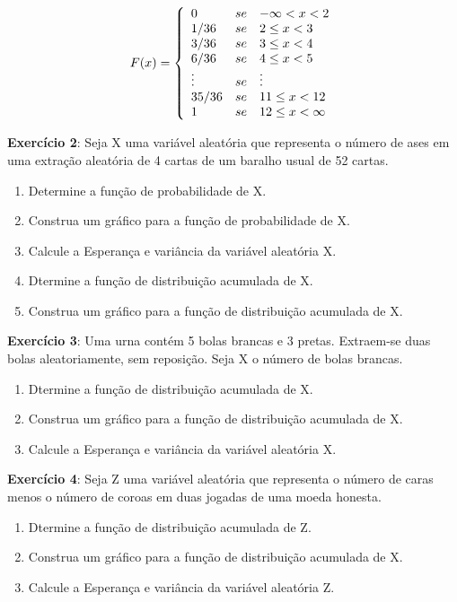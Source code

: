 $$
F(x)=
\left\{%
\begin{array}{ll}
   0      & se \quad \hbox{$-\infty < x < 2$} \\
   1/36   & se \quad \hbox{$2 \leq x < 3$} \\
   3/36   & se \quad \hbox{$3 \leq x < 4$} \\
   6/36   & se \quad \hbox{$4 \leq x < 5$} \\
   \vdots & se \quad \hbox{$\vdots$} \\
   35/36  & se \quad \hbox{$11 \leq x < 12$} \\
    1     & se \quad \hbox{$12 \leq x < \infty$} \\
\end{array}%
\right.
$$


\textbf{Exercício 2}: Seja X uma variável aleatória que representa
o número de ases em uma extração aleatória de 4 cartas de um
baralho usual de 52 cartas.

\begin{enumerate}
    \item Determine a função de probabilidade de X.
    \item Construa um gráfico para a função de probabilidade de X.
    \item Calcule a Esperança e variância da variável aleatória X.
    \item Dtermine a função de distribuição acumulada de X.
    \item Construa um gráfico para a função de distribuição acumulada de X.
\end{enumerate}

\textbf{Exercício 3}: Uma urna contém 5 bolas brancas e 3 pretas.
Extraem-se duas bolas aleatoriamente, sem reposição. Seja X o
número de bolas brancas.

\begin{enumerate}
    \item Dtermine a função de distribuição acumulada de X.
    \item Construa um gráfico para a função de distribuição acumulada de X.
    \item Calcule a Esperança e variância da variável aleatória X.
\end{enumerate}

\textbf{Exercício 4}: Seja Z uma variável aleatória que representa
o número de caras menos o número de coroas em duas jogadas de uma
moeda honesta.

\begin{enumerate}
    \item Dtermine a função de distribuição acumulada de Z.
    \item Construa um gráfico para a função de distribuição acumulada de X.
    \item Calcule a Esperança e variância da variável aleatória Z.
\end{enumerate}

